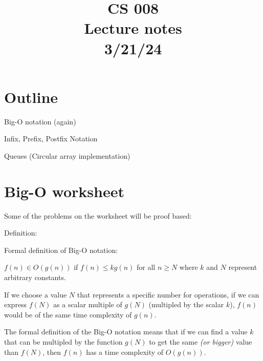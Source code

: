 \documentclass[11pt,a4paper,english]{paper}
\begin{document}
\title{CS 008 \\ Lecture notes \\ 3/21/24}
\maketitle

\section{Outline}

\begin{itemize} {

    \item Big-O notation (again)
    \item Infix, Prefix, Postfix Notation
    \item Queues (Circular array implementation)

} \end{itemize}

\section{Big-O worksheet}

Some of the problems on the worksheet will be proof based:

\bigskip

\begin{bluebox}{Definition:} {

    Formal definition of Big-O notation:

    \bigskip

    $f(n) \in O(g(n))$ if $f(n) \leq kg(n)$ for all $n \geq N$ where $k$ and $N$ represent arbitrary constants.

    \bigskip

    If we choose a value $N$ that represents a specific number for operations, if we can express $f(N)$ as a scalar multiple of $g(N)$ (multipled by the scalar $k$), $f(n)$ would be of the same time complexity of $g(n)$.

}\end{bluebox}

\bigskip

The formal definition of the Big-O notation means that if we can find a value $k$ that can be multipled by the function $g(N)$ to get the same \textit{(or bigger)} value than $f(N)$, then $f(n)$ has a time complexity of $O(g(n))$. 

\bigskip
\end{document}
